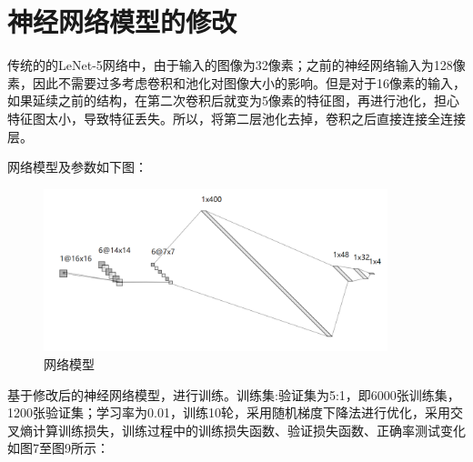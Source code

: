 \documentclass{article}
\begin{document}
	\section{神经网络模型的修改}
	
	传统的的LeNet-5网络中，由于输入的图像为32像素；之前的神经网络输入为128像素，因此不需要过多考虑卷积和池化对图像大小的影响。但是对于16像素的输入，如果延续之前的结构，在第二次卷积后就变为5像素的特征图，再进行池化，担心特征图太小，导致特征丢失。所以，将第二层池化去掉，卷积之后直接连接全连接层。
	
	网络模型及参数如下图：
	
	\begin{figure}
		\centering
		\includegraphics[width=10cm]{figure/9.png}
		\caption{网络模型}
	\end{figure}
	
	基于修改后的神经网络模型，进行训练。训练集:验证集为5:1，即6000张训练集，1200张验证集；学习率为0.01，训练10轮，采用随机梯度下降法进行优化，采用交叉熵计算训练损失，训练过程中的训练损失函数、验证损失函数、正确率测试变化如图7至图9所示：
	
\end{document}
